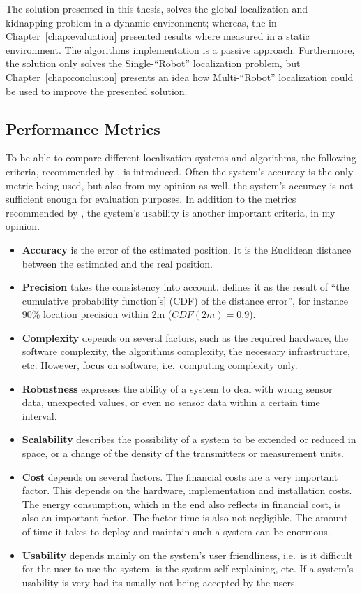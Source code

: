 \noindent The solution presented in this thesis, solves the global localization and kidnapping problem in a dynamic environment; whereas, the in Chapter~\ref{chap:evaluation} presented results where measured in a static environment. The algorithms implementation is a passive approach. Furthermore, the solution only solves the Single-``Robot'' localization problem, but Chapter~\ref{chap:conclusion} presents an idea how Multi-``Robot'' localization could be used to improve the presented solution.

\subsection{Performance Metrics}
To be able to compare different localization systems and algorithms, the following criteria, recommended by \citet{IEEE:survey_wireless_indoor_pos}, is introduced. Often the system's accuracy is the only metric being used, but also from my opinion as well, the system's accuracy is not sufficient enough for evaluation purposes. In addition to the metrics recommended by \citet{IEEE:survey_wireless_indoor_pos}, the system's usability is another important criteria, in my opinion.
\begin{itemize}
	\item \textbf{Accuracy} is the error of the estimated position. It is the Euclidean distance between the estimated and the real position.
	\item \textbf{Precision} takes the consistency into account. \citet{IEEE:survey_wireless_indoor_pos} defines it as the result of ``the cumulative probability function[s] (CDF) of the distance error'', for instance 90\% location precision within 2m ($CDF(2m) = 0.9$).
	\item \textbf{Complexity} depends on several factors, such as the required hardware, the software complexity, the algorithms complexity, the necessary infrastructure, etc. However, \citet{IEEE:survey_wireless_indoor_pos} focus on software, i.e.\ computing complexity only.
	\item \textbf{Robustness} expresses the ability of a system to deal with wrong sensor data, unexpected values, or even no sensor data within a certain time interval.
	\item \textbf{Scalability} describes the possibility of a system to be extended or reduced in space, or a change of the density of the transmitters or measurement units.
	\item \textbf{Cost} depends on several factors. The financial costs are a very important factor. This depends on the hardware, implementation and installation costs. The energy consumption, which in the end also reflects in financial cost, is also an important factor. The factor time is also not negligible. The amount of time it takes to deploy and maintain such a system can be enormous.
	\item \textbf{Usability} depends mainly on the system's user friendliness, i.e.\ is it difficult for the user to use the system, is the system self-explaining, etc. If a system's usability is very bad its usually not being accepted by the users.
\end{itemize}


